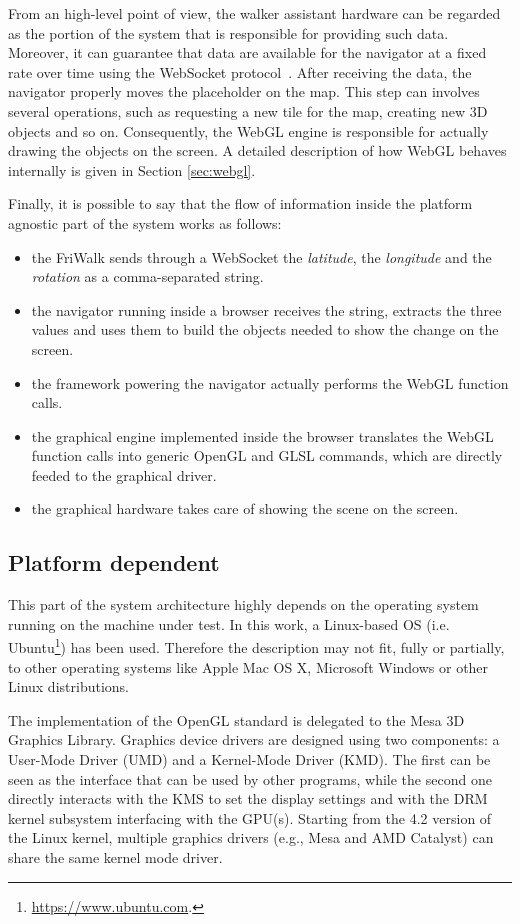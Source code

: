 From an high-level point of view, the walker assistant hardware can be regarded
as the portion of the system that is responsible for providing such data. Moreover,
it can guarantee that data are available for the navigator at a fixed rate over
time using the WebSocket protocol~\cite{fette2011websocket}.
After receiving the data, the navigator properly moves the placeholder on the map.
This step can involves several operations, such as requesting a new tile for the
map, creating new 3D objects and so on. Consequently, the WebGL engine is responsible
for actually drawing the objects on the screen. A detailed description of how WebGL
behaves internally is given in Section \ref{sec:webgl}.

Finally, it is possible to say that the flow of information inside the platform
agnostic part of the system works as follows:
\begin{itemize}
    \item the FriWalk sends through a WebSocket the \emph{latitude}, the
        \emph{longitude} and the \emph{rotation} as a comma-separated string.
    \item the navigator running inside a browser receives the string, extracts
        the three values and uses them to build the objects needed to show the
        change on the screen.
    \item the framework powering the navigator actually performs the
        WebGL function calls.
    \item the graphical engine implemented inside the browser translates the WebGL
        function calls into generic OpenGL and GLSL commands, which are directly
        feeded to the graphical driver.
    \item the graphical hardware takes care of showing the scene on the screen.
\end{itemize}


\subsection{Platform dependent} \label{sec:platform_dependent}
This part of the system architecture highly depends on the operating system
running on the machine under test. In this work, a Linux-based OS (i.e.
Ubuntu\footnote{\url{https://www.ubuntu.com}.})
has been used. Therefore the description may not fit, fully or partially, to
other operating systems like Apple Mac OS X, Microsoft Windows or other Linux
distributions.

The implementation of the OpenGL standard is delegated to the Mesa 3D Graphics Library.
Graphics device drivers are designed using two components: a User-Mode Driver
(UMD) and a Kernel-Mode Driver (KMD). The first can be seen as the interface
that can be used by other programs, while the second one directly interacts
with the KMS to set the display settings and with the DRM kernel subsystem
interfacing with the GPU(s). Starting from the 4.2 version of the Linux kernel,
multiple graphics drivers (e.g., Mesa and AMD Catalyst) can share the same kernel
mode driver.


